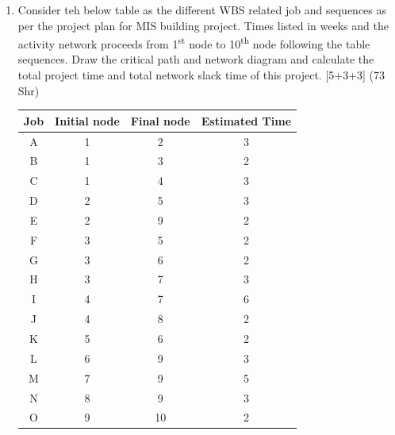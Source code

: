 \documentclass[12pt]{article}
\newcommand{\super}[1]{\textsuperscript{#1}}
\begin{document}
\begin{enumerate}
      \item Consider teh below table as the different WBS related job and sequences as per the project plan for MIS building project. Times listed in weeks and the activity network proceeds from 1\super{st} node to 10\super{th} node following the table sequences. Draw the critical path and network diagram and calculate the total project time and total network slack time of this project. \hfill [5+3+3] (73 Shr)\\
        \begin{tabular}{|c|c|c|c|}
          \hline
          Job & Initial node & Final node & Estimated Time \\ \hline
          A & 1 & 2 & 3 \\ \hline
          B & 1 & 3 & 2 \\ \hline
          C & 1 & 4 & 3 \\ \hline
          D & 2 & 5 & 3 \\ \hline
          E & 2 & 9 & 2 \\ \hline
          F & 3 & 5 & 2 \\ \hline
          G & 3 & 6 & 2 \\ \hline
          H & 3 & 7 & 3 \\ \hline
          I & 4 & 7 & 6 \\ \hline
          J & 4 & 8 & 2 \\ \hline
          K & 5 & 6 & 2 \\ \hline
          L & 6 & 9 & 3 \\ \hline
          M & 7 & 9 & 5 \\ \hline
          N & 8 & 9 & 3 \\ \hline
          O & 9 & 10 & 2 \\ \hline
        \end{tabular}


\end{enumerate}
\end{document}
